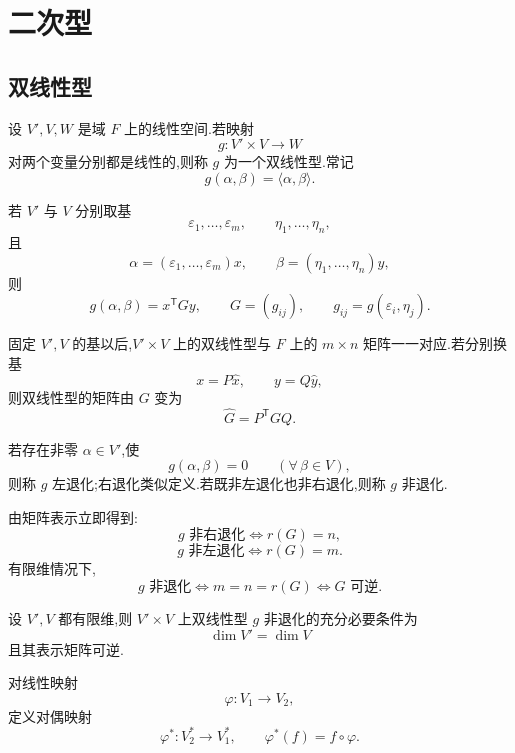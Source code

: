 \setcounter{chapter}{6}
\pagestyle{fancy}

\chapter{二次型}

\section{双线性型}

\begin{definition}
设 $V',V,W$ 是域 $F$ 上的线性空间.若映射
\[
g:V'\times V\to W
\]
对两个变量分别都是线性的,则称 $g$ 为一个双线性型.常记
\[
g(\alpha,\beta)=\langle\alpha,\beta\rangle.
\]
\end{definition}

若 $V'$ 与 $V$ 分别取基
\[
\varepsilon_1,\ldots,\varepsilon_m,
\qquad
\eta_1,\ldots,\eta_n,
\]
且
\[
\alpha=(\varepsilon_1,\ldots,\varepsilon_m)x,
\qquad
\beta=(\eta_1,\ldots,\eta_n)y,
\]
则
\[
g(\alpha,\beta)=x^{\mathsf T}Gy,
\qquad
G=(g_{ij}),
\qquad
g_{ij}=g(\varepsilon_i,\eta_j).
\]

\begin{theorem}[\markstar]
固定 $V',V$ 的基以后,$V'\times V$ 上的双线性型与 $F$ 上的
$m\times n$ 矩阵一一对应.若分别换基
\[
x=P\widehat x,\qquad y=Q\widehat y,
\]
则双线性型的矩阵由 $G$ 变为
\[
\widehat G=P^{\mathsf T}GQ.
\]
\end{theorem}

\begin{definition}
若存在非零 $\alpha\in V'$,使
\[
g(\alpha,\beta)=0
\qquad
(\forall\,\beta\in V),
\]
则称 $g$ 左退化;右退化类似定义.若既非左退化也非右退化,则称
$g$ 非退化.
\end{definition}

由矩阵表示立即得到:
\[
g\text{ 非右退化}\iff r(G)=n,
\]
\[
g\text{ 非左退化}\iff r(G)=m.
\]
有限维情况下,
\[
g\text{ 非退化}
\iff
m=n=r(G)
\iff
G\text{ 可逆}.
\]

\begin{theorem}[\markstar]
设 $V',V$ 都有限维,则 $V'\times V$ 上双线性型 $g$ 非退化的充分必要条件为
\[
\dim V'=\dim V
\]
且其表示矩阵可逆.
\end{theorem}

\begin{definition}
对线性映射
\[
\varphi:V_1\to V_2,
\]
定义对偶映射
\[
\varphi^*:V_2^*\to V_1^*,
\qquad
\varphi^*(f)=f\circ\varphi.
\]
\end{definition}


